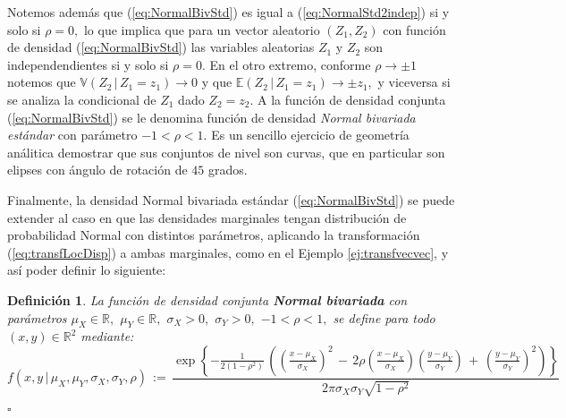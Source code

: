 \documentclass[spanish,10pt,letterpaper]{article}
\newtheorem{defi}{Definición}
\newcommand{\esper}{\mathbb{E}}
\newcommand{\vari}{\mathbb{V}}
\newcommand{\Runo}{\mathbb{R}}
\newcommand{\qed}{\begin{flushright}$\square$\end{flushright}}
\begin{document}
\medskip 

Notemos además que (\ref{eq:NormalBivStd}) es igual a (\ref{eq:NormalStd2indep}) si y solo si $\rho=0,$ lo que implica que para un vector aleatorio $(Z_1,Z_2)$ con función de densidad (\ref{eq:NormalBivStd}) las variables aleatorias $Z_1$ y $Z_2$ son independendientes si y solo si $\rho=0.$ En el otro extremo, conforme $\rho\rightarrow\pm 1$ notemos que $\vari(Z_2\,|\,Z_1=z_1)\rightarrow 0$ y que $\esper(Z_2\,|\,Z_1=z_1)\rightarrow\pm z_1,$ y viceversa si se analiza la condicional de $Z_1$ dado $Z_2=z_2.$ A la función de densidad conjunta (\ref{eq:NormalBivStd}) se le denomina función de densidad \textit{Normal bivariada estándar} con parámetro $-1<\rho<1.$ Es un sencillo ejercicio de geometría análitica demostrar que sus conjuntos de nivel son curvas, que en particular son elipses con ángulo de rotación  de $45$ grados.

\medskip 

Finalmente, la densidad Normal bivariada estándar (\ref{eq:NormalBivStd}) se puede extender al caso en que las densidades marginales tengan distribución de probabilidad Normal con distintos parámetros, aplicando la transformación (\ref{eq:transfLocDisp}) a ambas marginales, como en el Ejemplo \ref{ej:transfvecvec}, y así poder definir lo siguiente:

\bigskip 

\begin{defi}\label{def:NormalBivariada}
    La función de densidad conjunta \textbf{Normal bivariada} con parámetros $\mu_X\in\Runo,$ $\mu_Y\in\Runo,$ $\sigma_X>0,$ $\sigma_Y>0,$ $-1<\rho<1,$ se define para todo $(x,y)\in\Runo^2$ mediante:
    $$f(x,y\,|\,\mu_X,\mu_Y,\sigma_X,\sigma_Y,\rho) \,:=\, \frac{\exp\left\{ -\frac{1}{2(1-\rho^2)}\, \left( \left(\frac{x-\mu_X}{\sigma_X}\right)^2 \,-\, 2\rho\left(\frac{x-\mu_X}{\sigma_X}\right)\left(\frac{y-\mu_Y}{\sigma_Y}\right) \,+\, \left(\frac{y-\mu_Y}{\sigma_Y}\right)^2 \right) \right\}}{2\pi\sigma_X\sigma_Y\sqrt{1-\rho^2}}$$ \qed 
\end{defi}
\end{document}
